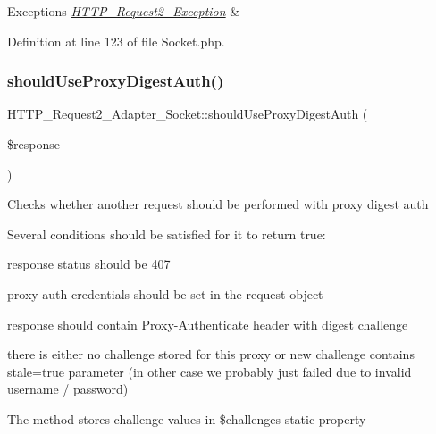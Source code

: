 \begin{DoxyExceptions}{Exceptions}
{\em \hyperlink{classHTTP__Request2__Exception}{H\+T\+T\+P\+\_\+\+Request2\+\_\+\+Exception}} & \\
\hline
\end{DoxyExceptions}


Definition at line 123 of file Socket.\+php.

\hypertarget{classHTTP__Request2__Adapter__Socket_af26e1fe3de20a109ff76fbadab10ec28}{}\label{classHTTP__Request2__Adapter__Socket_af26e1fe3de20a109ff76fbadab10ec28} 
\subsubsection{\texorpdfstring{should\+Use\+Proxy\+Digest\+Auth()}{shouldUseProxyDigestAuth()}}
{\footnotesize\ttfamily H\+T\+T\+P\+\_\+\+Request2\+\_\+\+Adapter\+\_\+\+Socket\+::should\+Use\+Proxy\+Digest\+Auth (\begin{DoxyParamCaption}\item[{\hyperlink{classHTTP__Request2__Response}{H\+T\+T\+P\+\_\+\+Request2\+\_\+\+Response}}]{\$response }\end{DoxyParamCaption})\hspace{0.3cm}{\ttfamily [protected]}}

Checks whether another request should be performed with proxy digest auth

Several conditions should be satisfied for it to return true\+:
\begin{DoxyItemize}
\item response status should be 407
\item proxy auth credentials should be set in the request object
\item response should contain Proxy-\/\+Authenticate header with digest challenge
\item there is either no challenge stored for this proxy or new challenge contains stale=true parameter (in other case we probably just failed due to invalid username / password)
\end{DoxyItemize}

The method stores challenge values in \$challenges static property



